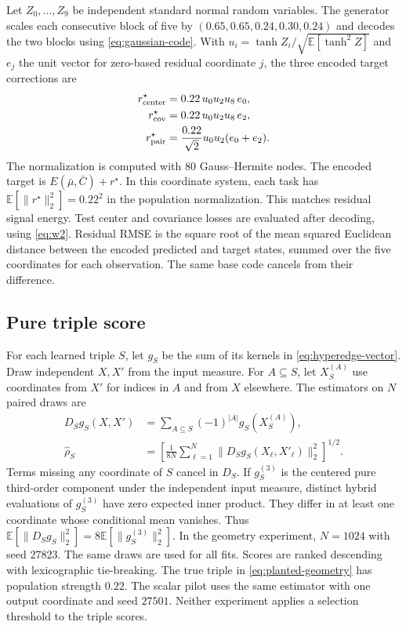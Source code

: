 \documentclass[11pt]{article}
\let\StudyMathSubsection\subsection
\newcommand{\E}{\mathbb{E}}
\newcommand{\norm}[1]{\lVert #1\rVert}
\begin{document}
Let \(Z_0,\ldots,Z_9\) be independent standard normal random variables.
The generator scales each consecutive block of five by
\((0.65,0.65,0.24,0.30,0.24)\) and decodes the two blocks using
\eqref{eq:gaussian-code}. With \(u_i=\tanh Z_i/\sqrt{\E[\tanh^2 Z]}\)
and \(e_j\) the unit vector for zero-based residual coordinate \(j\), the
three encoded target corrections are
\begin{align}
 r_{\rm center}^\star &=0.22\,u_0u_2u_8\,e_0,\nonumber\\
 r_{\rm cov}^\star    &=0.22\,u_0u_2u_8\,e_2,\nonumber\\
 r_{\rm pair}^\star   &=\frac{0.22}{\sqrt 2}u_0u_2(e_0+e_2).
 \label{eq:planted-geometry}
\end{align}
The normalization is computed with 80 Gauss--Hermite nodes. The encoded
target is \(E(\bar\mu,\bar C)+r^\star\). In this coordinate system,
each task has \(\E[\norm{r^\star}_2^2]=0.22^2\) in the population
normalization. This matches residual signal energy. Test center and
covariance losses are evaluated after decoding, using \eqref{eq:w2}.
Residual RMSE is the square root of the mean squared Euclidean distance
between the encoded predicted and target states, summed over the five
coordinates for each observation. The same base code cancels from
their difference.

\StudyMathSubsection{Pure triple score}

For each learned triple \(S\), let \(g_S\) be the sum of its kernels
in \eqref{eq:hyperedge-vector}. Draw independent \(X,X'\) from the
input measure. For \(A\subseteq S\), let \(X_S^{(A)}\) use coordinates
from \(X'\) for indices in \(A\) and from \(X\) elsewhere. The estimators
on \(N\) paired draws are
\begin{align}
 D_Sg_S(X,X')&=\sum_{A\subseteq S}(-1)^{|A|}g_S(X_S^{(A)}),\nonumber\\
 \widehat \rho_S&=\left[\frac{1}{8N}\sum_{\ell=1}^N
        \norm{D_Sg_S(X_\ell,X'_\ell)}_2^2\right]^{1/2}.
 \label{eq:triple-recovery}
\end{align}
Terms missing any coordinate of \(S\) cancel in \(D_S\). If \(g_S^{(3)}\)
is the centered pure third-order component under the independent input
measure, distinct hybrid evaluations of \(g_S^{(3)}\) have zero expected
inner product. They differ in at least one coordinate whose conditional
mean vanishes. Thus
\(\E[\norm{D_Sg_S}_2^2]=8\E[\norm{g_S^{(3)}}_2^2]\).
In the geometry experiment, \(N=1024\) with seed \(27823\). The same
draws are used for all fits. Scores are ranked descending with
lexicographic tie-breaking. The true triple in
\eqref{eq:planted-geometry} has population strength \(0.22\).
The scalar pilot uses the same estimator with one output coordinate and
seed \(27501\). Neither experiment applies a selection threshold to the
triple scores.
\end{document}
